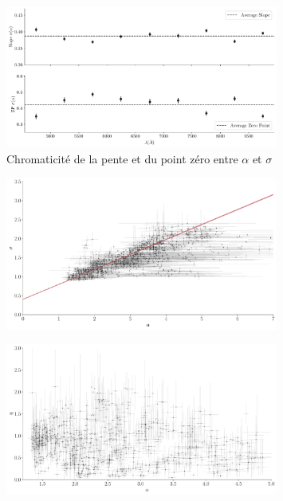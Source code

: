 \message{ !name(06_irf.tex)}\documentclass[../main/main.tex]{subfiles}
\begin{document}
\begin{figure}[ht]
  \centering
  \includegraphics[width=0.8\textwidth]{../figures/06_irf/chromaticitysigma_alpha_corr.pdf}
  \caption[Chromaticité de la pente et du point zéro entre $\alpha$ et $\sigma$]{Chromaticité de la pente et du point zéro entre $\alpha$ et $\sigma$}
  \label{fig:chromslope_zp_alphasigma}
\end{figure}

\begin{figure}[ht]
  \centering
  \includegraphics[width=0.8\textwidth]{../figures/06_irf/STD_correlation_betafixed.pdf}
  \caption[]{}
  \label{fig:corralphasigma_achrom}
\end{figure}



\begin{figure}[ht]
  \centering
  \includegraphics[width=0.8\textwidth]{../figures/06_irf/STD_correlation_betasigmafixed.pdf}
  \caption[]{}
  \label{fig:}
\end{figure}
\end{document}
